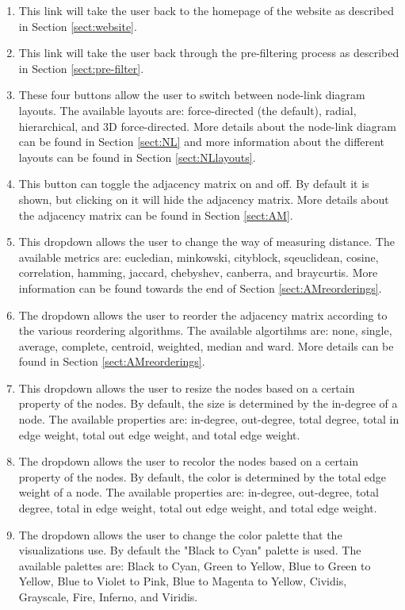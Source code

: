 \documentclass[journal]{vgtc}                %
\begin{document}
\begin{enumerate}
    \setlength\itemsep{0em}
    \item This link will take the user back to the homepage of the website as described in Section \ref{sect:website}.
    \item This link will take the user back through the pre-filtering process as described in Section \ref{sect:pre-filter}.
    \item These four buttons allow the user to switch between node-link diagram layouts. The available layouts are: force-directed (the default), radial, hierarchical, and 3D force-directed. More details about the node-link diagram can be found in Section \ref{sect:NL} and more information about the different layouts can be found in Section \ref{sect:NLlayouts}.
    \item This button can toggle the adjacency matrix on and off. By default it is shown, but clicking on it will hide the adjacency matrix. More details about the adjacency matrix can be found in Section \ref{sect:AM}.
    \item This dropdown allows the user to change the way of measuring distance. The available metrics are: eucledian, minkowski, cityblock, sqeuclidean, cosine, correlation, hamming, jaccard, chebyshev, canberra, and braycurtis. More information can be found towards the end of Section \ref{sect:AMreorderings}.
    \item The dropdown allows the user to reorder the adjacency matrix according to the various reordering algorithms. The available algortihms are: none, single, average, complete, centroid, weighted, median and ward. More details can be found in Section \ref{sect:AMreorderings}.
    \item This dropdown allows the user to resize the nodes based on a certain property of the nodes. By default, the size is determined by the in-degree of a node. The available properties are: in-degree, out-degree, total degree, total in edge weight, total out edge weight, and total edge weight.
    \item The dropdown allows the user to recolor the nodes based on a certain property of the nodes. By default, the color is determined by the total edge weight of a node. The available properties are: in-degree, out-degree, total degree, total in edge weight, total out edge weight, and total edge weight.
    \item The dropdown allows the user to change the color palette that the visualizations use. By default the "Black to Cyan" palette is used. The available palettes are: Black to Cyan, Green to Yellow, Blue to Green to Yellow, Blue to Violet to Pink, Blue to Magenta to Yellow, Cividis, Grayscale, Fire, Inferno, and Viridis.

\end{enumerate}
\end{document}
